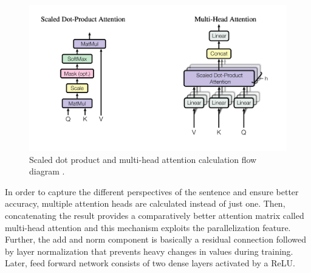 \documentclass[%
	BCOR=8mm, %
	DIV=12,
	toc=bibliography, %
	toc=listof, %
	oneside, %
	egregdoesnotlikesansseriftitles, %
	]{scrbook}
\begin{document}
\begin{figure}
    \centering
    \includegraphics[width=0.7\linewidth]{screenshot001}
    \caption[Calculation flow diagram of Scaled dot product and multi-head attention]{\small Scaled dot product and multi-head attention calculation flow diagram \cite{vaswani_attention_2017}. }
    \label{fig:selftattentionandmulti}
\end{figure}
In order to capture the different perspectives of the sentence and ensure better accuracy, multiple attention heads are calculated instead of just one. Then, concatenating the result provides a comparatively better attention matrix called multi-head attention and this mechanism exploits the parallelization feature.\\
Further, the add and norm component is basically a residual connection followed by layer normalization that prevents heavy changes in values during training. Later, feed forward network consists of two dense layers activated by a ReLU. 
\end{document}
